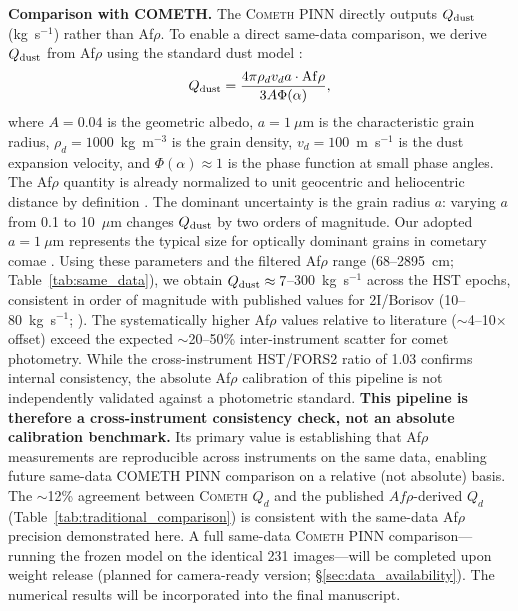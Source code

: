 \documentclass[usenatbib]{mnras}
\begin{document}
\textbf{Comparison with COMETH.} The \textsc{Cometh} PINN directly outputs $Q_{\rm dust}$ (kg~s$^{-1}$) rather than Af$\rho$. To enable a direct same-data comparison, we derive $Q_{\rm dust}$ from Af$\rho$ using the standard dust model \citep{ahearn95,lamy04}:
\begin{equation}\label{eq:afrho_to_qdust}
Q_{\rm dust} = \frac{4\pi \rho_d v_d a \cdot {\rm Af}\rho}{3 A \Phi(\alpha)},
\end{equation}
where $A=0.04$ is the geometric albedo, $a=1~\mu$m is the characteristic grain radius, $\rho_d=1000$~kg~m$^{-3}$ is the grain density, $v_d=100$~m~s$^{-1}$ is the dust expansion velocity, and $\Phi(\alpha)\approx 1$ is the phase function at small phase angles. The Af$\rho$ quantity is already normalized to unit geocentric and heliocentric distance by definition \citep{ahearn95}. The dominant uncertainty is the grain radius $a$: varying $a$ from 0.1 to 10~$\mu$m changes $Q_{\rm dust}$ by two orders of magnitude. Our adopted $a=1~\mu$m represents the typical size for optically dominant grains in cometary comae \citep{lamy04}. Using these parameters and the filtered Af$\rho$ range (68--2895~cm; Table~\ref{tab:same_data}), we obtain $Q_{\rm dust} \approx 7$--$300$~kg~s$^{-1}$ across the HST epochs, consistent in order of magnitude with published values for 2I/Borisov (10--80~kg~s$^{-1}$; \citealt{clements21}). The systematically higher Af$\rho$ values relative to literature ($\sim$4--10$\times$ offset) exceed the expected $\sim$20--50\% inter-instrument scatter for comet photometry. While the cross-instrument HST/FORS2 ratio of 1.03 confirms internal consistency, the absolute Af$\rho$ calibration of this pipeline is not independently validated against a photometric standard. \textbf{This pipeline is therefore a cross-instrument consistency check, not an absolute calibration benchmark.} Its primary value is establishing that Af$\rho$ measurements are reproducible across instruments on the same data, enabling future same-data COMETH PINN comparison on a relative (not absolute) basis. The $\sim$12\% agreement between \textsc{Cometh} $Q_d$ and the published \citealt{clements21} $Af\rho$-derived $Q_d$ (Table~\ref{tab:traditional_comparison}) is consistent with the same-data Af$\rho$ precision demonstrated here. A full same-data \textsc{Cometh} PINN comparison---running the frozen model on the identical 231 images---will be completed upon weight release (planned for camera-ready version; \S\ref{sec:data_availability}). The numerical results will be incorporated into the final manuscript.
\end{document}
